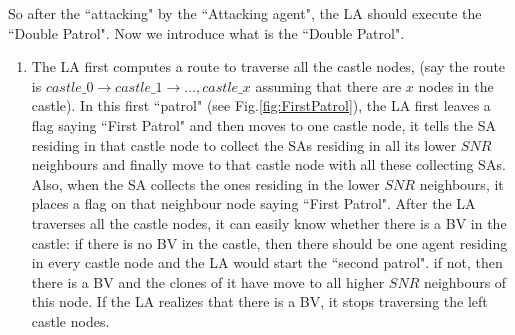 So after the ``attacking" by the ``Attacking agent", the LA should execute the ``Double Patrol". Now we introduce what is the ``Double Patrol".
\begin{enumerate}
\item 
The LA first computes a route to traverse all the castle nodes, (say the route is $castle\_0\rightarrow castle\_1 \rightarrow\ldots, castle\_x$ assuming that there are $x$ nodes in the castle). In this first ``patrol" (see Fig.\ref{fig:FirstPatrol}), the LA first leaves a flag saying ``First Patrol" and then moves to one castle node, it tells the SA residing in that castle node to collect the SAs residing in all its lower $SNR$ neighbours and finally move to that castle node with all these collecting SAs. Also, when the SA collects the ones residing in the lower $SNR$ neighbours, it places a flag on that neighbour node saying ``First Patrol". After the LA traverses all the castle nodes, it can easily know whether there is a BV in the castle: if there is no BV in the castle, then there should be one agent residing in every castle node and the LA would start the ``second patrol". if not, then there is a BV and the clones of it have move to all higher $SNR$ neighbours of this node. If the LA realizes that there is a BV, it stops traversing the left castle nodes.\\


\end{enumerate}
